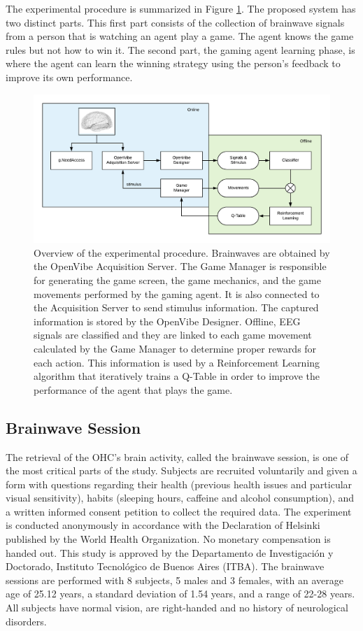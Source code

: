 \documentclass[journal]{IEEEtran}
\begin{document}
The experimental procedure is summarized in Figure \ref{diag:complete_flow}. The proposed system has two distinct parts. This first part consists of the collection of brainwave signals from a person that is watching an agent play a game.  The agent knows the game rules but not how to win it. The second part, the gaming agent learning phase, is where the agent can learn the winning strategy using the person's feedback to improve its own performance.

\begin{figure}
    \centering
    \includegraphics[width=\textwidth]{Images/complete_flow.png}
    \caption{Overview of the experimental procedure. Brainwaves are obtained by the OpenVibe Acquisition Server.  The Game Manager is responsible for generating the game screen, the game mechanics, and the game movements performed by the gaming agent.  It is also connected to the Acquisition Server to send stimulus information.  The captured information is stored by the OpenVibe Designer.  Offline, EEG signals are classified and they are linked to each game movement calculated by the Game Manager to determine proper rewards for each action.  This information is used by a Reinforcement Learning algorithm that iteratively trains a Q-Table in order to improve the performance of the agent that plays the game.}
    \label{diag:complete_flow}
\end{figure}

\subsection{Brainwave Session}
\label{brainwavesession}

The retrieval of the OHC's brain activity, called the brainwave session, is one of the most critical parts of the study.  Subjects are recruited voluntarily and given a form with questions regarding their health (previous health issues and particular visual sensitivity), habits (sleeping hours, caffeine and alcohol consumption), and a written informed consent petition to collect the required data.  The experiment is conducted anonymously in accordance with the Declaration of Helsinki published by the World Health Organization. No monetary compensation is handed out. This study is approved by the Departamento de Investigación y Doctorado, Instituto Tecnológico de Buenos Aires (ITBA).  The brainwave sessions are performed with 8 subjects, 5 males and 3 females, with an average age of 25.12 years, a standard deviation of 1.54 years, and a range of 22-28 years. All subjects have normal vision, are right-handed and no history of neurological disorders.
\end{document}
